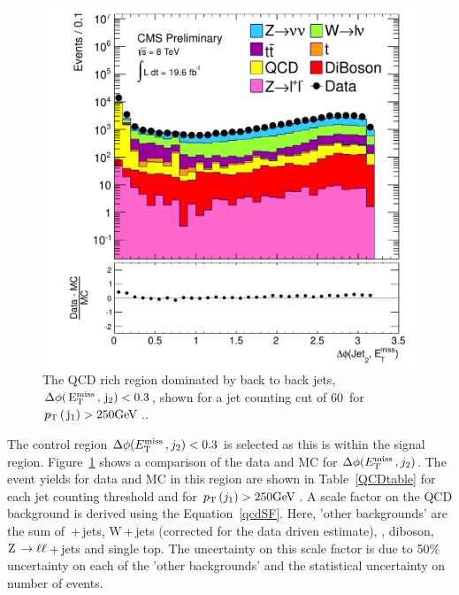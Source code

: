 \begin{figure}[htbp!]
\begin{center}
 \includegraphics[scale=0.4]{Figures/sus13009/dPhi_MetLep_Jet2.pdf}
\caption{The QCD rich region dominated by back to back jets, $\Delta \phi(\,\mathrm{E_{\text{T}}^{\text{miss}}\,}, \,\mathrm{j}_2)<0.3$, shown for a jet counting cut of 60~\GeV for $p_{\text{T}}\,(\,\mathrm{j}_1) > 250 \mathrm{GeV}\,$..}
\label{dphi_METj2}
\end{center}
\end{figure}


The control region $\Delta \phi (E_{\text{T}}^{\text{miss}}\,, j_{2}) < 0.3$ is selected as this is within the signal region.
Figure~\ref{dphi_METj2} shows a comparison of the data and MC for  $\Delta \phi (E_{\text{T}}^{\text{miss}}\,, j_{2})$. 
The event yields for data and MC in this region are shown in Table~\ref{QCDtable} for each jet counting \pt threshold and for $p_{\text{T}}\,(j_{1})>250 \mathrm{GeV}\,$. 
A scale factor on the QCD background is derived using the Equation~\ref{qcdSF}. Here, 'other backgrounds' are the sum of \znunu\,+\,jets,
W\,+\,jets (corrected for the data driven estimate), \ttbar, diboson, $\mathrm{Z}\, \rightarrow \ell\ell$\,+\,jets and single top.
The uncertainty on this scale factor is due to 50\% uncertainty on each of the 'other backgrounds' and the statistical uncertainty on number of events.

